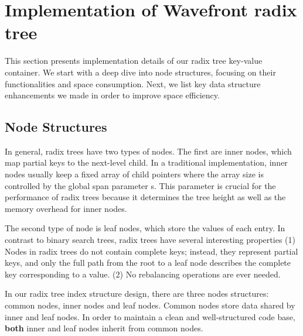 \documentclass[sigplan,screen,nonacm]{acmart}
\begin{document}
\section{Implementation of Wavefront radix tree}
This section presents implementation details of our radix tree key-value container. We start with a deep dive into node structures, focusing on their functionalities and space consumption. Next, we list key data structure enhancements we made in order to improve space efficiency.

\subsection{Node Structures}
In general, radix trees have two types of nodes. The first are inner nodes, which map partial keys to the next-level child. In a traditional implementation, inner nodes usually keep a fixed array of child pointers where the array size is controlled by the global span parameter s. This parameter is crucial for the performance of radix trees because it determines the tree height as well as the memory overhead for inner nodes. 

The second type of node is leaf nodes, which store the values of each entry. In contrast to binary search trees, radix trees have several interesting properties (1) Nodes in radix trees do not contain complete keys; instead, they represent partial keys, and only the full path from the root to a leaf node describes the complete key corresponding to a value. (2) No rebalancing operations are ever needed. 

In our radix tree index structure design, there are three nodes structures:  common nodes, inner nodes and leaf nodes. Common nodes store data shared by inner and leaf nodes. In order to maintain a clean and well-structured code base, \textbf{both} inner and leaf nodes inherit from common nodes. 
\end{document}
